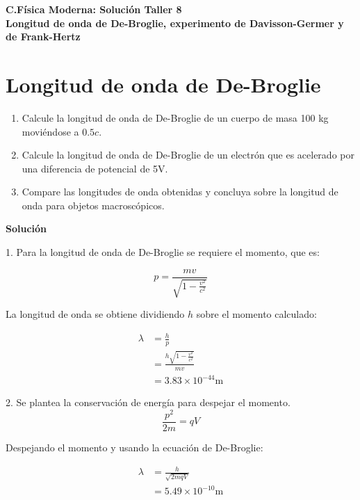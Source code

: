 \documentclass[12pt]{article}
\begin{document}
 
\begin{center}
\Large \textbf{C.Física Moderna: Solución Taller 8}\\
\normalsize \textbf{Longitud de onda de De-Broglie, experimento de Davisson-Germer y de Frank-Hertz}
\end{center}
 
  

\section{Longitud de onda de De-Broglie }



\begin{enumerate}
	\item Calcule la longitud de onda de De-Broglie de un cuerpo de masa 100 kg moviéndose a $0.5c$.
	\item Calcule la longitud de onda de De-Broglie de un electrón que es acelerado por una diferencia de potencial de 5V.
	\item Compare las longitudes de onda obtenidas y concluya sobre la longitud de onda para objetos macroscópicos.
\end{enumerate}


\begin{center}
	\textbf{Solución}
\end{center}

1. Para la longitud de onda de De-Broglie se requiere el momento, que es:

\begin{equation*}
p = \frac{m v}{\sqrt{1-\frac{v^2}{c^2}}}
\end{equation*} 

La longitud de onda se obtiene dividiendo $h$ sobre el momento calculado:

\begin{align*}
\lambda &= \frac{h}{p} \\
&= \frac{h\sqrt{1-\frac{v^2}{c^2}}}{m v}\\
& = 3.83 \times 10^{-44} \text{m}
\end{align*}

2. Se plantea la conservación de energía para despejar el momento.
\begin{equation*}
\frac{p^2}{2m} = q V
\end{equation*}

Despejando el momento y usando la ecuación de De-Broglie:

\begin{align*}
\lambda &= \frac{h}{\sqrt{2 m q V}}\\
 &= 5.49 \times 10^{-10} \text{m}
\end{align*}
\end{document}
